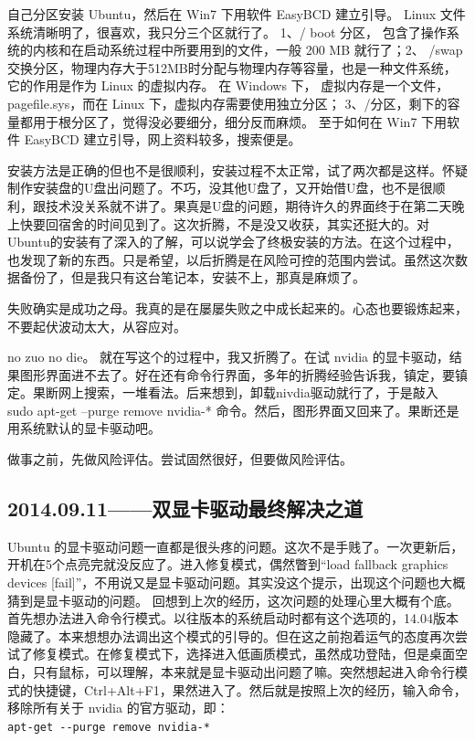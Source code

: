 \documentclass[cn,11pt,chinese,twoside]{elegantbook}
\begin{document}
自己分区安装 Ubuntu，然后在 Win7 下用软件 EasyBCD 建立引导。 Linux 文件系统清晰明了，很喜欢，我只分三个区就行了。 1、/ boot 分区， 包含了操作系统的内核和在启动系统过程中所要用到的文件，一般 200 MB 就行了；2、 /swap 交换分区，物理内存大于512MB时分配与物理内存等容量，也是一种文件系统，它的作用是作为 Linux 的虚拟内存。 在 Windows 下， 虚拟内存是一个文件， pagefile.sys，而在 Linux 下，虚拟内存需要使用独立分区； 3、/分区，剩下的容量都用于根分区了，觉得没必要细分，细分反而麻烦。 至于如何在 Win7 下用软件 EasyBCD 建立引导，网上资料较多，搜索便是。

安装方法是正确的但也不是很顺利，安装过程不太正常，试了两次都是这样。怀疑制作安装盘的U盘出问题了。不巧，没其他U盘了，又开始借U盘，也不是很顺利，跟技术没关系就不讲了。果真是U盘的问题，期待许久的界面终于在第二天晚上快要回宿舍的时间见到了。这次折腾，不是没又收获，其实还挺大的。对Ubuntu的安装有了深入的了解，可以说学会了终极安装的方法。在这个过程中，也发现了新的东西。只是希望，以后折腾是在风险可控的范围内尝试。虽然这次数据备份了，但是我只有这台笔记本，安装不上，那真是麻烦了。

失败确实是成功之母。我真的是在屡屡失败之中成长起来的。心态也要锻炼起来，不要起伏波动太大，从容应对。

no zuo no die。 就在写这个的过程中，我又折腾了。在试 nvidia 的显卡驱动，结果图形界面进不去了。好在还有命令行界面，多年的折腾经验告诉我，镇定，要镇定。果断网上搜索，一堆看法。后来想到，卸载nivdia驱动就行了，于是敲入
sudo apt-get --purge remove nvidia-*
 命令。然后，图形界面又回来了。果断还是用系统默认的显卡驱动吧。

做事之前，先做风险评估。尝试固然很好，但要做风险评估。



\subsection*{2014.09.11——双显卡驱动最终解决之道}
Ubuntu 的显卡驱动问题一直都是很头疼的问题。这次不是手贱了。一次更新后，开机在5个点亮完就没反应了。进入修复模式，偶然瞥到“load fallback graphics devices [fail]”，不用说又是显卡驱动问题。其实没这个提示，出现这个问题也大概猜到是显卡驱动的问题。 回想到上次的经历，这次问题的处理心里大概有个底。首先想办法进入命令行模式。以往版本的系统启动时都有这个选项的，14.04版本隐藏了。本来想想办法调出这个模式的引导的。但在这之前抱着运气的态度再次尝试了修复模式。在修复模式下，选择进入低画质模式，虽然成功登陆，但是桌面空白，只有鼠标，可以理解，本来就是显卡驱动出问题了嘛。突然想起进入命令行模式的快捷键，Ctrl+Alt+F1，果然进入了。然后就是按照上次的经历，输入命令，移除所有关于 nvidia 的官方驱动，即：\\
\verb|apt-get --purge remove nvidia-*|
\end{document}
